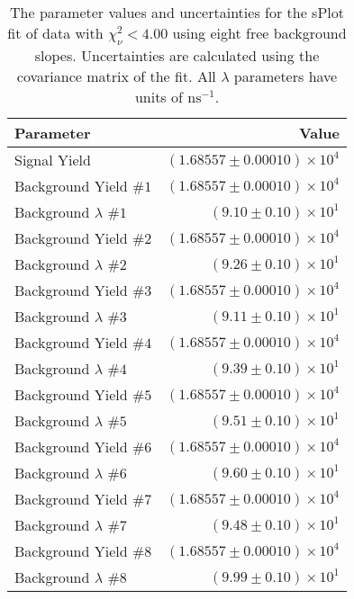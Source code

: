 
\begin{table}[h]
    \begin{center}
        \begin{tabular}{lr}\toprule
            Parameter & Value \\\midrule
            Signal Yield & $(1.68557 \pm 0.00010) \times 10^{4}$ \\
            Background Yield $\#1$ & $(1.68557 \pm 0.00010) \times 10^{4}$ \\
            Background $\lambda$ $\#1$ & $(9.10 \pm 0.10) \times 10^{1}$ \\
            Background Yield $\#2$ & $(1.68557 \pm 0.00010) \times 10^{4}$ \\
            Background $\lambda$ $\#2$ & $(9.26 \pm 0.10) \times 10^{1}$ \\
            Background Yield $\#3$ & $(1.68557 \pm 0.00010) \times 10^{4}$ \\
            Background $\lambda$ $\#3$ & $(9.11 \pm 0.10) \times 10^{1}$ \\
            Background Yield $\#4$ & $(1.68557 \pm 0.00010) \times 10^{4}$ \\
            Background $\lambda$ $\#4$ & $(9.39 \pm 0.10) \times 10^{1}$ \\
            Background Yield $\#5$ & $(1.68557 \pm 0.00010) \times 10^{4}$ \\
            Background $\lambda$ $\#5$ & $(9.51 \pm 0.10) \times 10^{1}$ \\
            Background Yield $\#6$ & $(1.68557 \pm 0.00010) \times 10^{4}$ \\
            Background $\lambda$ $\#6$ & $(9.60 \pm 0.10) \times 10^{1}$ \\
            Background Yield $\#7$ & $(1.68557 \pm 0.00010) \times 10^{4}$ \\
            Background $\lambda$ $\#7$ & $(9.48 \pm 0.10) \times 10^{1}$ \\
            Background Yield $\#8$ & $(1.68557 \pm 0.00010) \times 10^{4}$ \\
            Background $\lambda$ $\#8$ & $(9.99 \pm 0.10) \times 10^{1}$ \\\bottomrule
        \end{tabular}
        \caption{The parameter values and uncertainties for the sPlot fit of data with $\chi^2_\nu < 4.00$ using eight free background slopes. Uncertainties are calculated using the covariance matrix of the fit. All $\lambda$ parameters have units of $\si{\nano\second}^{-1}$.}
    \end{center}
\end{table}
